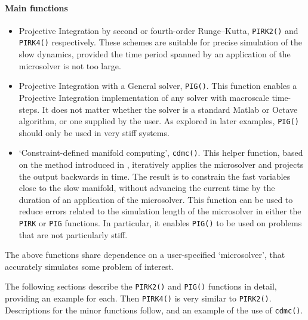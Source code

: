 \paragraph{Main functions}
\begin{itemize}
\item Projective Integration by second or fourth-order Runge--Kutta, \verb|PIRK2()| and \verb|PIRK4()| respectively.
These schemes are suitable for precise simulation of the slow dynamics, provided the time period spanned by an application of the microsolver is not too large.
\item Projective Integration with a General solver, \verb|PIG()|.
This function enables a Projective Integration implementation of any solver with macroscale time-steps.
It does not matter whether the solver is a standard Matlab or Octave algorithm, or one supplied by the user.
As explored in later examples, \verb|PIG()| should only be used in very stiff systems. 

\item `Constraint-defined manifold computing', \verb|cdmc()|.
This helper function, based on the method introduced in \cite{GearKevrekidis05},  iteratively applies the microsolver and projects the output backwards in time.
The result is to constrain the fast variables close to the slow manifold, without advancing the current time by the duration of an application of the microsolver.
This function can be used to reduce errors related to the simulation length of the microsolver in either the \verb|PIRK| or \verb|PIG| functions.
In particular, it enables \verb|PIG()| to be used on problems that are not particularly stiff.
\end{itemize}

The above functions share dependence on a user-specified `microsolver', that accurately simulates some problem of interest. 


The following sections describe the \verb|PIRK2()| and \verb|PIG()| functions in detail, providing an example for each.
Then \verb|PIRK4()| is very similar to \verb|PIRK2()|.
Descriptions for the minor functions follow, and an example of the use of \verb|cdmc()|.


